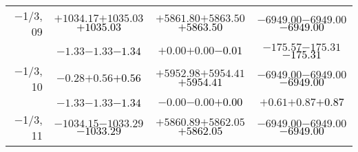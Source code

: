 \documentclass[compress]{beamer}
\begin{document}
\begin{frame}
{\begin{tabular}{r | c | c | c}
$-$1/3, 09 & $+1034.17$\hspace{0.1 cm}$+1035.03$\hspace{0.1 cm}\textcolor{black}{$+1035.03$} & $+5861.80$\hspace{0.1 cm}$+5863.50$\hspace{0.1 cm}\textcolor{black}{$+5863.50$} & $-6949.00$\hspace{0.1 cm}$-6949.00$\hspace{0.1 cm}\textcolor{black}{$-6949.00$} \\
           & $-1.33$\hspace{0.1 cm}$-1.33$\hspace{0.1 cm}\textcolor{black}{$-1.34$} & $+0.00$\hspace{0.1 cm}$+0.00$\hspace{0.1 cm}\textcolor{black}{$-0.01$} & $-175.57$\hspace{0.1 cm}$-175.31$\hspace{0.1 cm}\textcolor{black}{$-175.31$} \\
$-$1/3, 10 & $-0.28$\hspace{0.1 cm}$+0.56$\hspace{0.1 cm}\textcolor{black}{$+0.56$} & $+5952.98$\hspace{0.1 cm}$+5954.41$\hspace{0.1 cm}\textcolor{black}{$+5954.41$} & $-6949.00$\hspace{0.1 cm}$-6949.00$\hspace{0.1 cm}\textcolor{black}{$-6949.00$} \\
           & $-1.33$\hspace{0.1 cm}$-1.33$\hspace{0.1 cm}\textcolor{black}{$-1.34$} & $-0.00$\hspace{0.1 cm}$-0.00$\hspace{0.1 cm}\textcolor{black}{$+0.00$} & $+0.61$\hspace{0.1 cm}$+0.87$\hspace{0.1 cm}\textcolor{black}{$+0.87$} \\
$-$1/3, 11 & $-1034.15$\hspace{0.1 cm}$-1033.29$\hspace{0.1 cm}\textcolor{black}{$-1033.29$} & $+5860.89$\hspace{0.1 cm}$+5862.05$\hspace{0.1 cm}\textcolor{black}{$+5862.05$} & $-6949.00$\hspace{0.1 cm}$-6949.00$\hspace{0.1 cm}\textcolor{black}{$-6949.00$} \\

\end{tabular}}
\end{frame}
\end{document}
